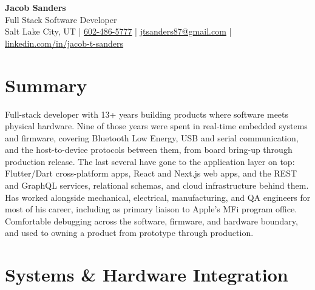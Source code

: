 \documentclass[10.5pt, letterpaper]{article}
\begin{document}
\begin{center}
  {\fontsize{28}{32}\selectfont\bfseries\color{accent} Jacob Sanders}\\[5pt]
  {\large\color{muted} Full Stack Software Developer}\\[8pt]
  \small
  \faMapMarker\enspace Salt Lake City, UT
  \enspace\textcolor{accent}{|}\enspace
  \faPhone\enspace \href{tel:6024865777}{602-486-5777}
  \enspace\textcolor{accent}{|}\enspace
  \faEnvelope\enspace \href{mailto:jtsanders87@gmail.com}{jtsanders87@gmail.com}
  \enspace\textcolor{accent}{|}\enspace
  \faLinkedin\enspace \href{https://linkedin.com/in/jacob-t-sanders}{linkedin.com/in/jacob-t-sanders}
\end{center}

\vspace{2pt}

\section{Summary}

Full-stack developer with 13+ years building products where software meets
physical hardware. Nine of those years were spent in real-time embedded systems
and firmware, covering Bluetooth Low Energy, USB and serial communication, and
the host-to-device protocols between them, from board bring-up through
production release. The last several have gone to the application layer on top: Flutter/Dart cross-platform apps, React
and Next.js web apps, and the REST and GraphQL services, relational schemas, and
cloud infrastructure behind them. Has worked alongside mechanical, electrical,
manufacturing, and QA engineers for most of his career, including as primary
liaison to Apple's MFi program office. Comfortable debugging across the
software, firmware, and hardware boundary, and used to owning a product from
prototype through production.

\section{Systems \& Hardware Integration}
\end{document}
